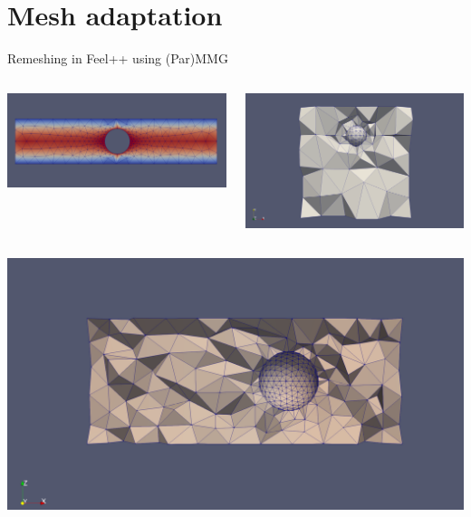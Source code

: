\documentclass{beamer}
\begin{document}
	\section{Mesh adaptation}
	\begin{frame}{Remeshing in Feel++ using (Par)MMG}
		\begin{columns}
			\begin{column}{0.49\textwidth}
				\includegraphics[width=\linewidth]{2d_remeshing.png}
			\end{column}
			\begin{column}{0.49\textwidth}
					\includegraphics[width=\linewidth]{DRIVEN_CAVITY.png}
			\end{column}
		\end{columns}
		\begin{columns}
			\begin{column}{0.5\textwidth}
					\includegraphics[width=\linewidth]{3D_SLIDING.png}

\end{column}
\end{columns}
\end{frame}
\end{document}
